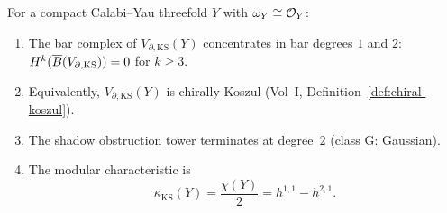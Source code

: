 \begin{theorem}
For a compact Calabi--Yau threefold $Y$ with $\omega_Y\cong\mathcal O_Y$:
\begin{enumerate}[label=(\roman*),leftmargin=1.8em]
\item The bar complex of $V_{\partial,\mathrm{KS}}(Y)$
concentrates in bar degrees $1$ and $2$:
$H^k(\overline{B}(V_{\partial,\mathrm{KS}}))=0$ for $k\ge 3$.
\item Equivalently, $V_{\partial,\mathrm{KS}}(Y)$ is
chirally Koszul (Vol~I, Definition~\ref*{def:chiral-koszul}).
\item The shadow obstruction tower terminates at degree~$2$
(class G: Gaussian).
\item The modular characteristic is
\begin{equation}%
\kappa_{\mathrm{KS}}(Y) = \frac{\chi(Y)}{2} = h^{1,1} - h^{2,1}.
\end{equation}
\end{enumerate}
\end{theorem}

